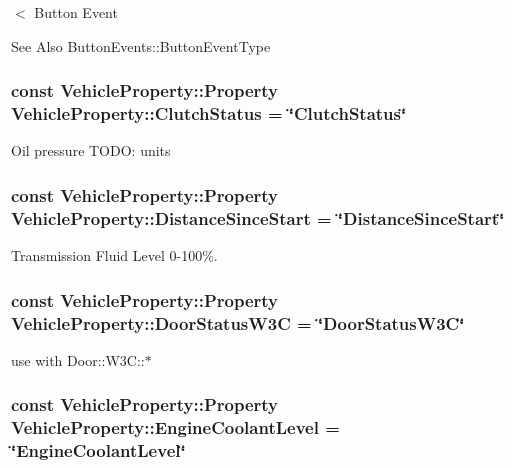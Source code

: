 $<$ Button Event \begin{DoxySeeAlso}{See Also}
Button\-Events\-::\-Button\-Event\-Type 
\end{DoxySeeAlso}
\hypertarget{classVehicleProperty_acdca2ca718fd392c7ad9b8adc817baec}{
\subsubsection[{Clutch\-Status}]{\setlength{\rightskip}{0pt plus 5cm}const Vehicle\-Property\-::\-Property Vehicle\-Property\-::\-Clutch\-Status = \char`\"{}Clutch\-Status\char`\"{}\hspace{0.3cm}{\ttfamily [static]}}}\label{classVehicleProperty_acdca2ca718fd392c7ad9b8adc817baec}
Oil pressure T\-O\-D\-O\-: units \hypertarget{classVehicleProperty_a340253da4ce8dfac2b40f3ee27d9ed4b}{
\subsubsection[{Distance\-Since\-Start}]{\setlength{\rightskip}{0pt plus 5cm}const Vehicle\-Property\-::\-Property Vehicle\-Property\-::\-Distance\-Since\-Start = \char`\"{}Distance\-Since\-Start\char`\"{}\hspace{0.3cm}{\ttfamily [static]}}}\label{classVehicleProperty_a340253da4ce8dfac2b40f3ee27d9ed4b}
Transmission Fluid Level 0-\/100\%. \hypertarget{classVehicleProperty_a43535323827c54d73fe8e7b68f131f79}{
\subsubsection[{Door\-Status\-W3\-C}]{\setlength{\rightskip}{0pt plus 5cm}const Vehicle\-Property\-::\-Property Vehicle\-Property\-::\-Door\-Status\-W3\-C = \char`\"{}Door\-Status\-W3\-C\char`\"{}\hspace{0.3cm}{\ttfamily [static]}}}\label{classVehicleProperty_a43535323827c54d73fe8e7b68f131f79}
use with Door\-::\-W3\-C\-:\-:$\ast$ \hypertarget{classVehicleProperty_aac38e43b1c1ec7239252dfafe6d19d87}{
\subsubsection[{Engine\-Coolant\-Level}]{\setlength{\rightskip}{0pt plus 5cm}const Vehicle\-Property\-::\-Property Vehicle\-Property\-::\-Engine\-Coolant\-Level = \char`\"{}Engine\-Coolant\-Level\char`\"{}\hspace{0.3cm}{\ttfamily [static]}}}\label{classVehicleProperty_aac38e43b1c1ec7239252dfafe6d19d87}
